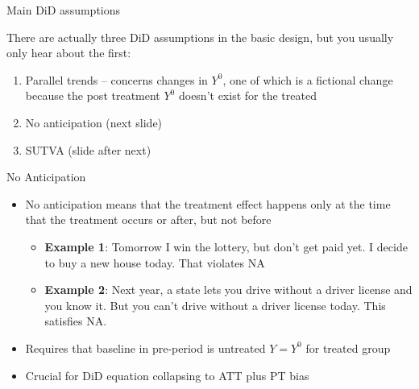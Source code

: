 \documentclass{beamer}
\begin{document}
\begin{frame}{Main DiD assumptions}

There are actually three DiD assumptions in the basic design, but you usually only hear about the first:

\bigskip

\begin{enumerate}
\item Parallel trends -- concerns changes in $Y^0$, one of which is a fictional change because the post treatment $Y^0$ doesn't exist for the treated
\item No anticipation (next slide)
\item SUTVA (slide after next)
\end{enumerate}

\end{frame}

\begin{frame}{No Anticipation}

\begin{itemize}
\item No anticipation means that the treatment effect happens only at the time that the treatment occurs or after, but not before
	\begin{itemize}
	\item \textbf{Example 1}: Tomorrow I win the lottery, but don't get paid yet. I decide to buy a new house today. That violates NA
	\item \textbf{Example 2}: Next year, a state lets you drive without a driver license and you know it. But you can't drive without a driver license today.  This satisfies NA.
	\end{itemize}
\item Requires that baseline in pre-period is untreated $Y=Y^0$ for treated group
\item Crucial for DiD equation collapsing to ATT plus PT bias
\end{itemize}

\end{frame}
\end{document}
